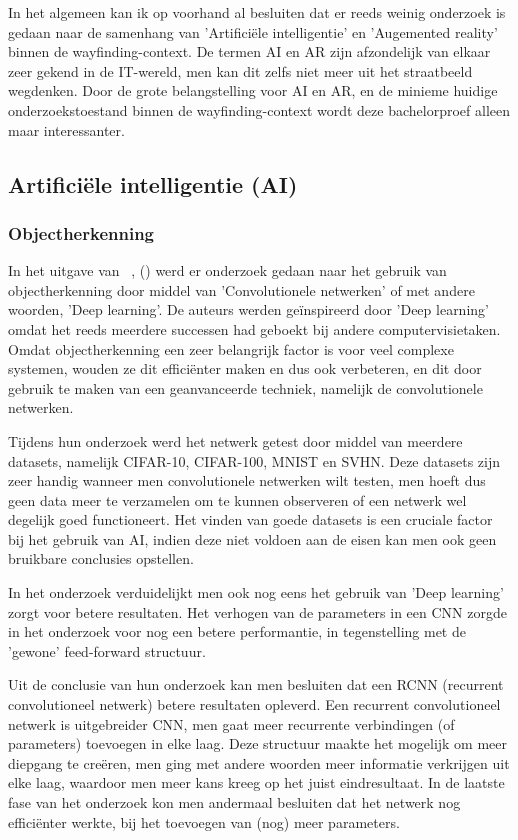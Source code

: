 In het algemeen kan ik op voorhand al besluiten dat er reeds weinig onderzoek is gedaan naar de samenhang van 'Artificiële intelligentie' en 'Augemented reality' binnen de wayfinding-context. De termen AI en AR zijn afzondelijk van elkaar zeer gekend in de IT-wereld, men kan dit zelfs niet meer uit het straatbeeld wegdenken. Door de grote belangstelling voor AI en AR, en de minieme huidige onderzoekstoestand binnen de wayfinding-context wordt deze bachelorproef alleen maar interessanter.

\subsection{Artificiële intelligentie (AI)}

\subsubsection{Objectherkenning}
In het uitgave van ~\textcite{Liang2015}, () werd er onderzoek gedaan naar het gebruik van objectherkenning door middel van 'Convolutionele netwerken' of met andere woorden, 'Deep learning'. De auteurs werden geïnspireerd door 'Deep learning' omdat het reeds meerdere successen had geboekt bij andere computervisietaken. Omdat objectherkenning een zeer belangrijk factor is voor veel complexe systemen, wouden ze dit efficiënter maken en dus ook verbeteren, en dit door gebruik te maken van een geanvanceerde techniek, namelijk de convolutionele netwerken. 

Tijdens hun onderzoek werd het netwerk getest door middel van meerdere datasets, namelijk CIFAR-10, CIFAR-100, MNIST en SVHN. Deze datasets zijn zeer handig wanneer men convolutionele netwerken wilt testen, men hoeft dus geen data meer te verzamelen om te kunnen observeren of een netwerk wel degelijk goed functioneert. Het vinden van goede datasets is een cruciale factor bij het gebruik van AI, indien deze niet voldoen aan de eisen kan men ook geen bruikbare conclusies opstellen.

In het onderzoek verduidelijkt men ook nog eens het gebruik van 'Deep learning' zorgt voor betere resultaten. Het verhogen van de parameters in een CNN zorgde in het onderzoek voor nog een betere performantie, in tegenstelling met de 'gewone' feed-forward structuur. 

Uit de conclusie van hun onderzoek kan men besluiten dat een RCNN (recurrent convolutioneel netwerk) betere resultaten opleverd. Een recurrent convolutioneel netwerk is uitgebreider CNN, men gaat meer recurrente verbindingen (of parameters) toevoegen in elke laag. Deze structuur maakte het mogelijk om meer diepgang te creëren, men ging met andere woorden meer informatie verkrijgen uit elke laag, waardoor men meer kans kreeg op het juist eindresultaat. In de laatste fase van het onderzoek kon men andermaal besluiten dat het netwerk nog efficiënter werkte, bij het toevoegen van (nog) meer parameters.

